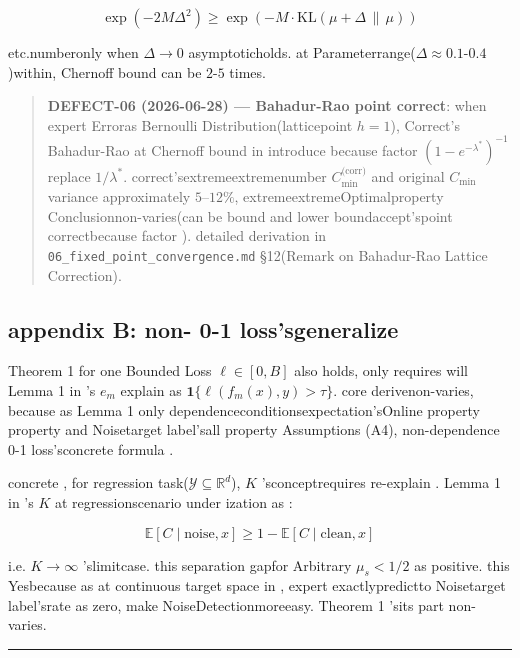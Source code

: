\documentclass[
  12pt,
]{article}
\begin{document}
\[\exp(-2M\Delta^2) \geq \exp(-M \cdot \text{KL}(\mu + \Delta \,\|\, \mu))\]

etc.numberonly when  \(\Delta \to 0\)
asymptoticholds. at Parameterrange(\(\Delta \approx 0.1\text{-}0.4\))within, Chernoff
bound can be  \(2\text{-}5\) times. 

\begin{quote}
\textbf{DEFECT-06  (2026-06-28) --- Bahadur-Rao point correct}:
when expert Erroras  Bernoulli Distribution(latticepoint  \(h=1\)), Correct's Bahadur-Rao
at  Chernoff bound in introduce because factor  \((1-e^{-\lambda^*})^{-1}\) replace
\(1/\lambda^*\). correct'sextremeextremenumber  \(C_{\min}^{\text{(corr)}}\)
and original \(C_{\min}\) variance approximately
\(5\)--\(12\%\), extremeextremeOptimalproperty Conclusionnon-varies(can be bound and lower boundaccept'spoint correctbecause factor ). detailed derivation in
\texttt{06\_fixed\_point\_convergence.md} §12(Remark on Bahadur-Rao
Lattice Correction). 
\end{quote}

\subsection{appendix B: non- 0-1
loss'sgeneralize }\label{ux9644ux5f55-bux975e-0-1-ux635fux5931ux7684ux63a8ux5e7f}

Theorem 1 for one Bounded Loss \(\ell \in [0, B]\) also holds, only requires will  Lemma 1 in 's
\(e_m\) explain as 
\(\mathbf{1}\{\ell(f_m(x), y) > \tau\}\). core derivenon-varies, because as  Lemma 1
only dependenceconditionsexpectation'sOnline property property and Noisetarget label'sall property Assumptions (A4), non-dependence 0-1
loss'sconcrete formula . 

concrete , for regression task(\(\mathcal{Y} \subseteq \mathbb{R}^d\)), \(K\)
'sconceptrequires re-explain . Lemma 1 in 's \(K\) at regressionscenario under ization as : 

\[ \mathbb{E}[C \mid \text{noise}, x] \geq 1 - \mathbb{E}[C \mid \text{clean}, x] \]

i.e. \(K \to \infty\) 'slimitcase. this separation gapfor Arbitrary \(\mu_s < 1/2\)
as positive. this Yesbecause as at continuous target space in , expert exactlypredictto Noisetarget label'srate as zero, make NoiseDetectionmoreeasy. Theorem
1 'sits part non-varies. 

\begin{center}\rule{0.5\linewidth}{0.5pt}\end{center}
\end{document}
